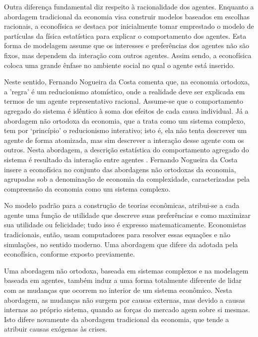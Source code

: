 
Outra diferença fundamental diz respeito à racionalidade dos agentes. Enquanto a abordagem tradicional da economia visa construir modelos baseados em escolhas racionais, a econofísica se destaca por inicialmente tomar emprestado o modelo de partículas da física estatística para explicar o comportamento dos agentes. Esta forma de modelagem assume que os interesses e preferências dos agentes não são fixos, mas dependem da interação com outros agentes. Assim sendo, a econofísica coloca uma grande ênfase no ambiente social no qual o agente está inserido\cite{JUSUP20221}.

Neste sentido, Fernando Nogueira da Costa comenta que, na economia ortodoxa, a 'regra' é um reducionismo atomístico, onde a realidade deve ser explicada em termos de um agente representativo racional. Assume-se que o comportamento agregado do sistema é idêntico à soma dos efeitos de cada causa individual. Já a abordagem não ortodoxa da economia, que a trata como um sistema complexo, tem por `princípio' o reducionismo interativo; isto é,  ela não tenta descrever um agente de forma atomizada, mas sim descrever a interação desse agente com os outros. Nesta abordagem, a descrição estatística do comportamento agregado do sistema é resultado da interação entre agentes \cite{Fernando}. Fernando Nogueira da Costa insere a econofísica no conjunto das abordagens não ortodoxas da economia, agrupadas sob a denominação de economia da complexidade, caracterizadas pela compreensão da economia como um sistema complexo.


No modelo padrão para a construção de teorias econômicas, atribui-se a cada agente uma função  de utilidade que descreve suas preferências e como maximizar sua utilidade ou felicidade; tudo isso é expresso matematicamente. Economistas tradicionais, então, usam computadores para resolver essas equações e não simulações, no sentido moderno. Uma abordagem que difere da adotada pela econofísica, conforme exposto previamente.

Uma abordagem não ortodoxa, baseada em sistemas complexos e na modelagem baseada em agentes, também induz a uma forma totalmente diferente de lidar com as mudanças que ocorrem no interior de um sistema econômico. Nesta abordagem, as mudanças não surgem por causas externas, mas devido a causas internas ao próprio sistema, quando as forças do mercado agem sobre si mesmas. Isto difere novamente da abordagem tradicional da economia, que tende a atribuir causas exógenas às crises.

